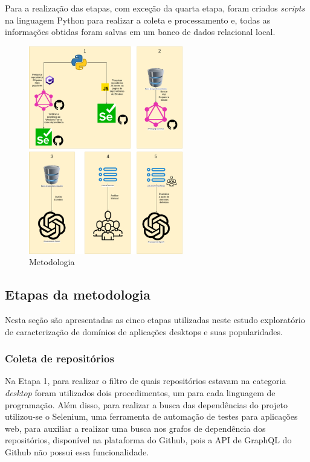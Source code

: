 \documentclass[12pt]{article}
\begin{document}
Para a realização das etapas, com exceção da quarta etapa, foram criados \textit{scripts} na linguagem Python para realizar a coleta e processamento e, todas as informações obtidas foram salvas em um banco de dados relacional local.

\begin{figure}[H]
    \centering
    \includegraphics[width=0.6\textwidth]{images/metflow2.png}
    \caption{Metodologia}
    \label{fig:Metodologia}
\end{figure}

\subsection{Etapas da metodologia}

Nesta seção são apresentadas as cinco etapas utilizadas neste estudo exploratório de caracterização de domínios de aplicações desktops e suas popularidades.

\subsubsection{Coleta de repositórios}

Na Etapa 1, para realizar o filtro de quais repositórios estavam na categoria \textit{desktop} foram utilizados dois procedimentos, um para cada linguagem de programação. Além disso, para realizar a busca das dependências do projeto utilizou-se o Selenium, uma ferramenta de automação de testes para aplicações web, para auxiliar a realizar uma busca nos grafos de dependência dos repositórios, disponível na plataforma do Github, pois a API de GraphQL do Github não possui essa funcionalidade.
\end{document}
